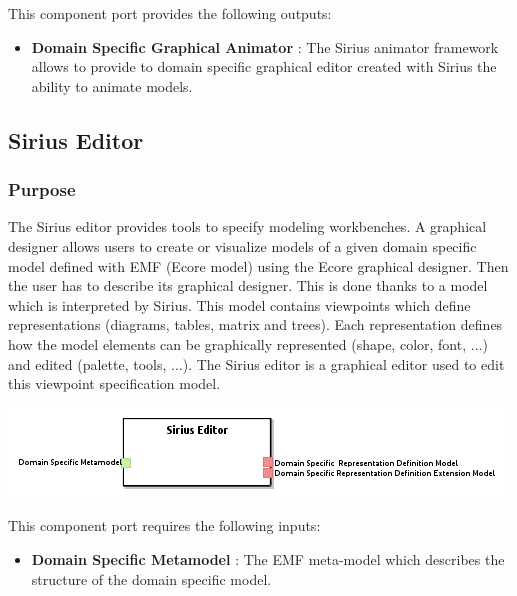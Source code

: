 \documentclass{gemoc} %
\begin{document}
This component port provides the following outputs:
\begin{itemize}
  \item \textbf{Domain Specific Graphical Animator} :
The Sirius animator framework allows to provide to domain specific graphical editor created with Sirius the ability to animate models.
\end{itemize}


\subsection{Sirius Editor}

\subsubsection{Purpose}
The Sirius editor provides tools to specify modeling workbenches. A graphical designer allows users to create or visualize models of a given domain specific model defined with EMF (Ecore model) using the Ecore graphical designer. Then the user has to describe its graphical designer. This is done thanks to a model which is interpreted by Sirius. This model contains viewpoints which define representations (diagrams, tables, matrix and trees). Each representation defines how the model elements can be graphically represented (shape, color, font, ...) and edited (palette, tools, ...).
The Sirius editor is a graphical editor used to edit this viewpoint specification model.

\begin{center}
\includegraphics*[trim=0.0cm 0.0cm 0cm 0.0cm, clip=true]{../images/generated/Generated_Sirius_Editor.png}
\end{center}

This component port requires the following inputs:
\begin{itemize}
  \item \textbf{Domain Specific Metamodel} :
The EMF meta-model which describes the structure of the domain specific model.
\end{itemize}
\end{document}
